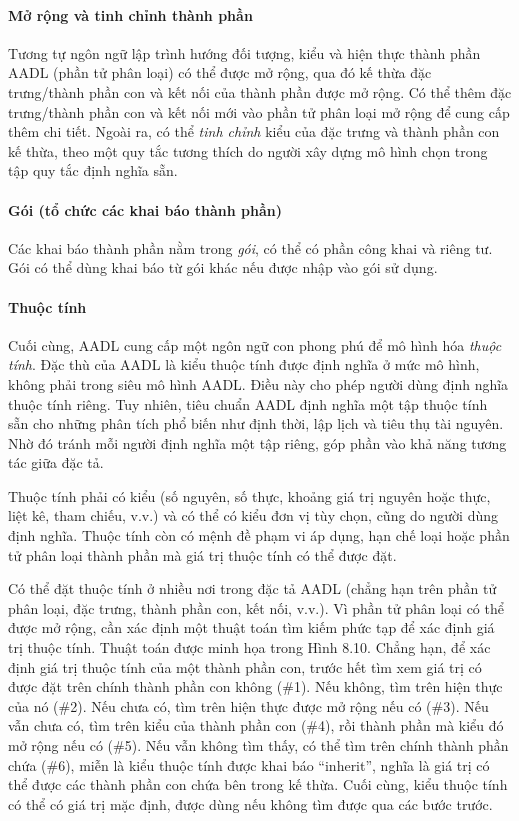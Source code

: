 \paragraph*{Mở rộng và tinh chỉnh thành phần}
Tương tự ngôn ngữ lập trình hướng đối tượng, kiểu và hiện thực thành phần AADL (phần tử phân loại) có thể được mở rộng, qua đó kế thừa đặc trưng/thành phần con và kết nối của thành phần được mở rộng. Có thể thêm đặc trưng/thành phần con và kết nối mới vào phần tử phân loại mở rộng để cung cấp thêm chi tiết. Ngoài ra, có thể \emph{tinh chỉnh} kiểu của đặc trưng và thành phần con kế thừa, theo một quy tắc tương thích do người xây dựng mô hình chọn trong tập quy tắc định nghĩa sẵn.

\paragraph*{Gói (tổ chức các khai báo thành phần)}
Các khai báo thành phần nằm trong \emph{gói}, có thể có phần công khai và riêng tư. Gói có thể dùng khai báo từ gói khác nếu được nhập vào gói sử dụng.

\paragraph*{Thuộc tính}
Cuối cùng, AADL cung cấp một ngôn ngữ con phong phú để mô hình hóa \emph{thuộc tính}. Đặc thù của AADL là kiểu thuộc tính được định nghĩa ở mức mô hình, không phải trong siêu mô hình AADL. Điều này cho phép người dùng định nghĩa thuộc tính riêng. Tuy nhiên, tiêu chuẩn AADL định nghĩa một tập thuộc tính sẵn cho những phân tích phổ biến như định thời, lập lịch và tiêu thụ tài nguyên. Nhờ đó tránh mỗi người định nghĩa một tập riêng, góp phần vào khả năng tương tác giữa đặc tả.

Thuộc tính phải có kiểu (số nguyên, số thực, khoảng giá trị nguyên hoặc thực, liệt kê, tham chiếu, v.v.) và có thể có kiểu đơn vị tùy chọn, cũng do người dùng định nghĩa. Thuộc tính còn có mệnh đề phạm vi áp dụng, hạn chế loại hoặc phần tử phân loại thành phần mà giá trị thuộc tính có thể được đặt.

Có thể đặt thuộc tính ở nhiều nơi trong đặc tả AADL (chẳng hạn trên phần tử phân loại, đặc trưng, thành phần con, kết nối, v.v.). Vì phần tử phân loại có thể được mở rộng, cần xác định một thuật toán tìm kiếm phức tạp để xác định giá trị thuộc tính. Thuật toán được minh họa trong Hình 8.10. Chẳng hạn, để xác định giá trị thuộc tính của một thành phần con, trước hết tìm xem giá trị có được đặt trên chính thành phần con không (\#1). Nếu không, tìm trên hiện thực của nó (\#2). Nếu chưa có, tìm trên hiện thực được mở rộng nếu có (\#3). Nếu vẫn chưa có, tìm trên kiểu của thành phần con (\#4), rồi thành phần mà kiểu đó mở rộng nếu có (\#5). Nếu vẫn không tìm thấy, có thể tìm trên chính thành phần chứa (\#6), miễn là kiểu thuộc tính được khai báo ``inherit'', nghĩa là giá trị có thể được các thành phần con chứa bên trong kế thừa. Cuối cùng, kiểu thuộc tính có thể có giá trị mặc định, được dùng nếu không tìm được qua các bước trước.

